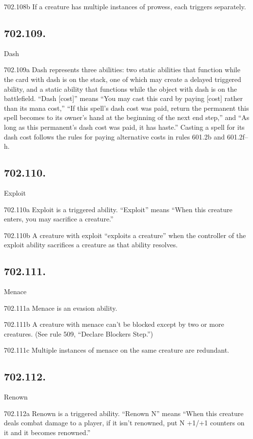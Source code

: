 702.108b If a creature has multiple instances of prowess, each triggers separately.

\subsection*{702.109.}
Dash

702.109a Dash represents three abilities: two static abilities that function while the card with dash is on the stack, one of which may create a delayed triggered ability, and a static ability that functions while the object with dash is on the battlefield. “Dash [cost]” means “You may cast this card by paying [cost] rather than its mana cost,” “If this spell’s dash cost was paid, return the permanent this spell becomes to its owner’s hand at the beginning of the next end step,” and “As long as this permanent’s dash cost was paid, it has haste.” Casting a spell for its dash cost follows the rules for paying alternative costs in rules 601.2b and 601.2f–h.

\subsection*{702.110.}
Exploit

702.110a Exploit is a triggered ability. “Exploit” means “When this creature enters, you may sacrifice a creature.”

702.110b A creature with exploit “exploits a creature” when the controller of the exploit ability sacrifices a creature as that ability resolves.

\subsection*{702.111.}
Menace

702.111a Menace is an evasion ability.

702.111b A creature with menace can’t be blocked except by two or more creatures. (See rule 509, “Declare Blockers Step.”)

702.111c Multiple instances of menace on the same creature are redundant.

\subsection*{702.112.}
Renown

702.112a Renown is a triggered ability. “Renown N” means “When this creature deals combat damage to a player, if it isn’t renowned, put N +1/+1 counters on it and it becomes renowned.”

